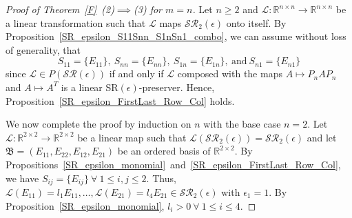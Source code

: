 \documentclass[11pt,reqno]{amsart}
\theoremstyle{plain}
\theoremstyle{definition}
\numberwithin{equation}{section}
\begin{document}
\begin{proof}[Proof of Theorem~\ref{F}~(2)$\implies$(3) for $m=n$] 
	Let $n\geq2$ and $\mathcal{L}:\mathbb{R}^{n\times n}\to\mathbb{R}^{n\times n}$ be a linear transformation such that $\mathcal{L}$ maps $\mathcal{SR}_2(\epsilon)$ onto itself. By Proposition~\ref{SR_epsilon_S11Snn_S1nSn1_combo}, we can assume without loss of generality, that
	\begin{equation}\label{SR_epsilon_square_S11SnnSn1S1n_wlog}
		S_{11}=\{E_{11}\}, ~ S_{nn}=\{E_{nn}\}, ~ S_{1n}=\{E_{1n}\}, ~ \text{and} ~ S_{n1}=\{E_{n1}\}
	\end{equation}
	since $\mathcal{L}\in P(\mathcal{SR}(\epsilon))$ if and only if $\mathcal{L}$ composed with the maps $A\mapsto P_nAP_n$ and $A\mapsto A^T$ is a linear SR$(\epsilon)$-preserver. Hence, Proposition~\ref{SR_epsilon_FirstLast_Row_Col} holds.
	
	We now complete the proof by induction on $n$ with the
	base case $n=2$. Let $\mathcal{L}:\mathbb{R}^{2\times2}\to\mathbb{R}^{2\times2}$ be a linear map such that $\mathcal{L}(\mathcal{SR}_2(\epsilon))=\mathcal{SR}_2(\epsilon)$ and let $\mathfrak{B}=(E_{11}, E_{22}, E_{12}, E_{21})$ be an ordered basis of $\mathbb{R}^{2\times 2}$. By Propositions~\ref{SR_epsilon_monomial}~and~\ref{SR_epsilon_FirstLast_Row_Col}, we have $S_{ij}=\{E_{ij}\}\ \forall~1\leq i,j\leq 2$. Thus, $\mathcal{L}(E_{11})=l_{1}E_{11},\ldots,\mathcal{L}(E_{21})=l_{4}E_{21}\in
	\mathcal{SR}_2(\epsilon)$ with $\epsilon_1=1$. By Proposition~\ref{SR_epsilon_monomial}, $l_{i}>0\ \forall~1\leq i\leq 4$. 


\end{proof}
\end{document}
